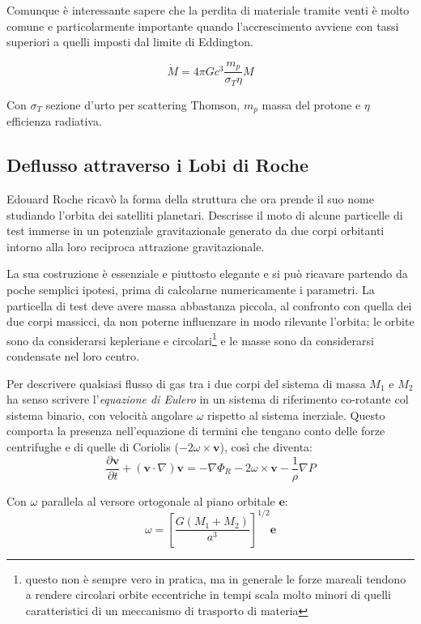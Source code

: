 \documentclass[a4paperbi]{article}
\begin{document}
	Comunque è interessante sapere che la perdita di materiale tramite venti è molto comune e particolarmente importante quando l'accrescimento avviene con tassi superiori a quelli imposti dal limite di Eddington.
	
	\begin{equation}
		\dot{M}=4\pi Gc^3\frac{m_p}{\sigma_T \eta}M
	\end{equation}
	
	Con $\sigma_T$ sezione d'urto per scattering Thomson, $m_p$ massa del protone e $\eta$ efficienza radiativa.

\subsection{Deflusso attraverso i Lobi di Roche}
	Edouard Roche ricavò la forma della struttura che ora prende il suo nome studiando l'orbita dei satelliti planetari. Descrisse il moto di alcune particelle di test immerse in un potenziale gravitazionale generato da due corpi orbitanti intorno alla loro reciproca attrazione gravitazionale.
	
	La sua costruzione è essenziale e piuttosto elegante e si può ricavare partendo da poche semplici ipotesi, prima di calcolarne numericamente i parametri. La particella di test deve avere massa abbastanza piccola, al confronto con quella dei due corpi massicci, da non poterne influenzare in modo rilevante l'orbita; le orbite sono da considerarsi kepleriane e circolari\footnote{questo non è sempre vero in pratica, ma in generale le forze mareali tendono a rendere circolari orbite eccentriche in tempi scala molto minori di quelli caratteristici di un meccanismo di trasporto di materia} e le masse sono da considerarsi condensate nel loro centro.
	
	Per descrivere qualsiasi flusso di gas tra i due corpi del sistema di massa $M_1$ e $M_2$ ha senso scrivere l'\textit{equazione di Eulero} in un sistema di riferimento co-rotante col sistema binario, con velocità angolare $\omega$ rispetto al sistema inerziale. Questo comporta la presenza nell'equazione di termini che tengano conto delle forze centrifughe e di quelle di Coriolis ($-2\omega\times\textbf{v}$), così che diventa:
	\begin{equation}
		\frac{\partial \textbf{v}}{\partial t}+(\textbf{v}\cdot\nabla)\textbf{v}=-\nabla\Phi_R-2\omega\times\textbf{v}-\frac{1}{\rho}\nabla P
	\end{equation}
	
	Con $\omega$ parallela al versore ortogonale al piano orbitale $\textbf{e}$:
	\begin{equation}
		\omega=\left[\frac{G(M_1+M_2)}{a^3}\right]^{1/2}\textbf{e}
	\end{equation}
	
\end{document}
